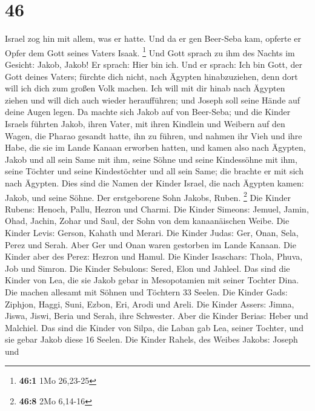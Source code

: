 \hypertarget{section-10}{%
\section{46}\label{section-10}}

 Israel zog hin mit allem, was er hatte. Und da er gen
Beer-Seba kam, opferte er Opfer dem Gott seines Vaters Isaak.
\footnote{\textbf{46:1} 1Mo 26,23-25}  Und Gott sprach zu
ihm des Nachts im Gesicht: Jakob, Jakob! Er sprach: Hier bin ich.
 Und er sprach: Ich bin Gott, der Gott deines Vaters;
fürchte dich nicht, nach Ägypten hinabzuziehen, denn dort will ich dich
zum großen Volk machen.  Ich will mit dir hinab nach
Ägypten ziehen und will dich auch wieder heraufführen; und Joseph soll
seine Hände auf deine Augen legen.  Da machte sich Jakob
auf von Beer-Seba; und die Kinder Israels führten Jakob, ihren Vater,
mit ihren Kindlein und Weibern auf den Wagen, die Pharao gesandt hatte,
ihn zu führen,  und nahmen ihr Vieh und ihre Habe, die sie
im Lande Kanaan erworben hatten, und kamen also nach Ägypten, Jakob und
all sein Same mit ihm,  seine Söhne und seine Kindessöhne
mit ihm, seine Töchter und seine Kindestöchter und all sein Same; die
brachte er mit sich nach Ägypten.  Dies sind die Namen der
Kinder Israel, die nach Ägypten kamen: Jakob, und seine Söhne. Der
erstgeborene Sohn Jakobs, Ruben. \footnote{\textbf{46:8} 2Mo 6,14-16}
 Die Kinder Rubens: Henoch, Pallu, Hezron und Charmi.
 Die Kinder Simeons: Jemuel, Jamin, Ohad, Jachin, Zohar
und Saul, der Sohn von dem kanaanäischen Weibe.  Die
Kinder Levis: Gerson, Kahath und Merari.  Die Kinder
Judas: Ger, Onan, Sela, Perez und Serah. Aber Ger und Onan waren
gestorben im Lande Kanaan. Die Kinder aber des Perez: Hezron und Hamul.
 Die Kinder Isaschars: Thola, Phuva, Job und Simron.
 Die Kinder Sebulons: Sered, Elon und Jahleel.
 Das sind die Kinder von Lea, die sie Jakob gebar in
Mesopotamien mit seiner Tochter Dina. Die machen allesamt mit Söhnen und
Töchtern 33 Seelen.  Die Kinder Gads: Ziphjon, Haggi,
Suni, Ezbon, Eri, Arodi und Areli.  Die Kinder Assers:
Jimna, Jiswa, Jiswi, Beria und Serah, ihre Schwester. Aber die Kinder
Berias: Heber und Malchiel.  Das sind die Kinder von
Silpa, die Laban gab Lea, seiner Tochter, und sie gebar Jakob diese 16
Seelen.  Die Kinder Rahels, des Weibes Jakobs: Joseph und
